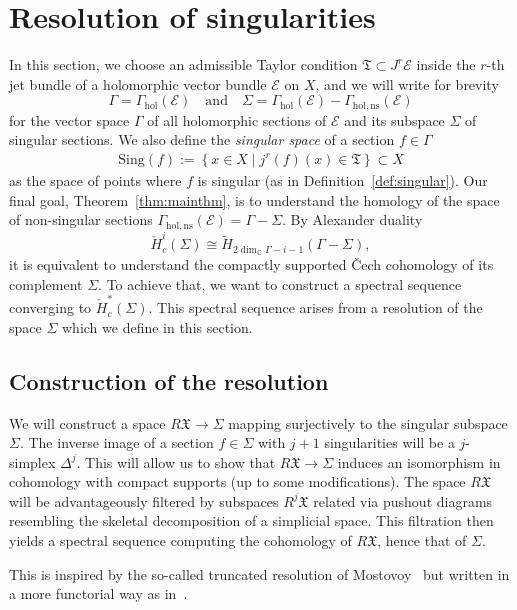 \documentclass[a4paper]{amsart}
\newcommand{\bC}{\mathbb C}
\newcommand{\cE}{\mathcal E}
\newcommand{\fX}{\mathfrak X}
\newcommand{\fT}{\mathfrak T}
\theoremstyle{plain}
\theoremstyle{definition}
\newcommand{\CCH}{\check{H}_{c}}
\newcommand{\Gammahol}{\Gamma_{\mathrm{hol}}}
\begin{document}
\section{Resolution of singularities}\label{section:resolution}

In this section, we choose an admissible Taylor condition $\fT \subset J^r\cE$ inside the $r$-th jet bundle of a holomorphic vector bundle $\cE$ on $X$, and we will write for brevity
\[
    \Gamma = \Gammahol\left(\cE\right) \quad \text{and} \quad \Sigma = \Gammahol\left(\cE\right) - \Gamma_{\mathrm{hol, ns}}\left(\cE\right)
\]
for the vector space $\Gamma$ of all holomorphic sections of $\cE$ and its subspace $\Sigma$ of singular sections. We also define the \emph{singular space} of a section $f \in \Gamma$
\begin{align}\label{eqn:defsingularset}
    \mathrm{Sing}(f) := \left\{ x \in X \mid j^r(f)(x) \in \fT \right\} \subset X
\end{align}
as the space of points where $f$ is singular (as in Definition~\ref{def:singular}). Our final goal, Theorem~\ref{thm:mainthm}, is to understand the homology of the space of non-singular sections $\Gamma_{\mathrm{hol, ns}}\left(\cE\right) = \Gamma - \Sigma$. By Alexander duality
\[
    \CCH^{i}(\Sigma) \cong \widetilde{H}_{2\dim_\bC \Gamma - i -1}(\Gamma - \Sigma),
\]
it is equivalent to understand the compactly supported \v{C}ech cohomology of its complement $\Sigma$. To achieve that, we want to construct a spectral sequence converging to $\CCH^*(\Sigma)$. This spectral sequence arises from a resolution of the space $\Sigma$ which we define in this section.

\subsection{Construction of the resolution}

We will construct a space $R\fX \to \Sigma$ mapping surjectively to the singular subspace $\Sigma$. The inverse image of a section $f\in \Sigma$ with $j+1$ singularities will be a $j$-simplex $\Delta^j$. This will allow us to show that $R\fX \to \Sigma$ induces an isomorphism in cohomology with compact supports (up to some modifications). The space $R\fX$ will be advantageously filtered by subspaces $R^j\fX$ related via pushout diagrams resembling the skeletal decomposition of a simplicial space. This filtration then yields a spectral sequence computing the cohomology of $R\fX$, hence that of $\Sigma$.

This is inspired by the so-called truncated resolution of Mostovoy~\cite{mostovy_truncated_2012} but written in a more functorial way as in~\cite{vokrinek_generalization_2007}.
\end{document}
